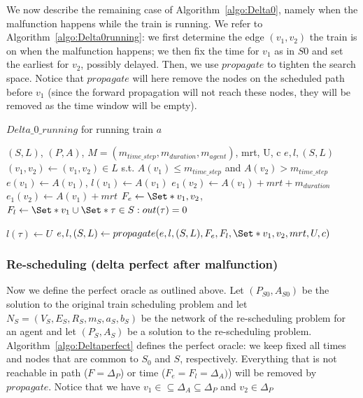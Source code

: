\documentclass{article}
\begin{document}
We now describe the remaining case of Algorithm~\ref{algo:Delta0}, namely when the malfunction happens while the train is running. We refer to Algorithm~\ref{algo:Delta0running}: we first determine the edge $(v_1,v_2)$ the train is on when the malfunction happens; we then fix the time for $v_1$ as in $S0$ and set the earliest for $v_2$, possibly delayed. Then, we use $propagate$ to tighten the search space. Notice that $propagate$ will here remove the nodes on the scheduled path before $v_1$ (since the forward propagation will not reach these nodes, they will be removed as the time window will be empty).


\begin{algorithm}
	\caption{$Delta\_0\_running$ for running train $a$} \label{algo:Delta0running}
	\begin{algorithmic}[1]
		\Require $(S,L)$, $(P,A)$, $M=(m_{time\_step},m_{duration},m_{agent})$, mrt, U, c
	    \Ensure $e,l,(S,L)$
	    \State $(v_1,v_2) \leftarrow (v_1,v_2) \in L$ s.t. $A(v_1)\leq m_{time\_step}$ and $A(v_2)>m_{time\_step}$
		\State $e(v_1)\leftarrow A(v_1)$, $l(v_1) \leftarrow A(v_1)$ 
            \State $e_1(v_2) \leftarrow A(v_1)+mrt+m_{duration}$
        \Else
            \State $e_1(v_2) \leftarrow A(v_1)+mrt$
        \EndIf
        \State $F_e \leftarrow \Set*{v_1,v_2}$, $F_l \leftarrow \Set*{v_1} \cup \Set*{\tau \in S: out(\tau)=0}$
	
	        \State $l(\tau) \leftarrow U$
	    \EndFor
		\State $e,l,(S,L) \leftarrow propagate(e,l,(S,L),F_e,F_l, \Set*{v_1,v_2}, mrt, U, c)$
	\end{algorithmic} 
\end{algorithm}





        

\subsubsection{Re-scheduling (delta perfect after malfunction)}\label{subsubsec:Deltaperfect}

Now we define the perfect oracle as outlined above.
Let $(P_{S0},A_{S0})$ be the solution to the original train scheduling problem
and let $N_S=(V_S,E_S,R_S,m_S,a_S,b_S)$ be the network of the re-scheduling problem for an agent
and  let $(P_S,A_S)$ be a solution to the re-scheduling problem. Algorithm~\ref{algo:Deltaperfect} defines the perfect oracle: we keep fixed all times and nodes that are common to $S_0$ and $S$, respectively. Everything that is not reachable in path ($F=\Delta_P$) or time ($F_e=F_l=\Delta_A)$) will be removed by $propagate$. Notice that we have $v_1 \in\subseteq \Delta_A \subseteq \Delta_P$ and $v_2 \in \Delta_P$
\end{document}

